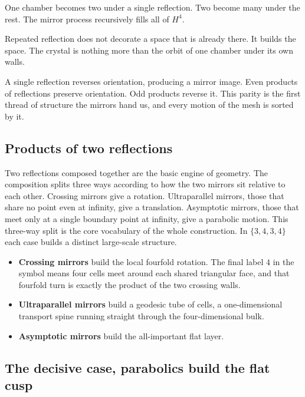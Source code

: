 One chamber becomes two under a single reflection. Two become many under the rest. The mirror process recursively fills all of $H^4$.

\begin{principle}
Repeated reflection does not decorate a space that is already there. It builds the space. The crystal is nothing more than the orbit of one chamber under its own walls.
\end{principle}

A single reflection reverses orientation, producing a mirror image. Even products of reflections preserve orientation. Odd products reverse it. This parity is the first thread of structure the mirrors hand us, and every motion of the mesh is sorted by it.

\subsection{Products of two reflections}

Two reflections composed together are the basic engine of geometry. The composition splits three ways according to how the two mirrors sit relative to each other. Crossing mirrors give a rotation. Ultraparallel mirrors, those that share no point even at infinity, give a translation. Asymptotic mirrors, those that meet only at a single boundary point at infinity, give a parabolic motion. This three-way split is the core vocabulary of the whole construction. In $\{3,4,3,4\}$ each case builds a distinct large-scale structure.

\begin{itemize}
\item \textbf{Crossing mirrors} build the local fourfold rotation. The final label $4$ in the symbol means four cells meet around each shared triangular face, and that fourfold turn is exactly the product of the two crossing walls.
\item \textbf{Ultraparallel mirrors} build a geodesic tube of cells, a one-dimensional transport spine running straight through the four-dimensional bulk.
\item \textbf{Asymptotic mirrors} build the all-important flat layer.
\end{itemize}

\subsection{The decisive case, parabolics build the flat cusp}

